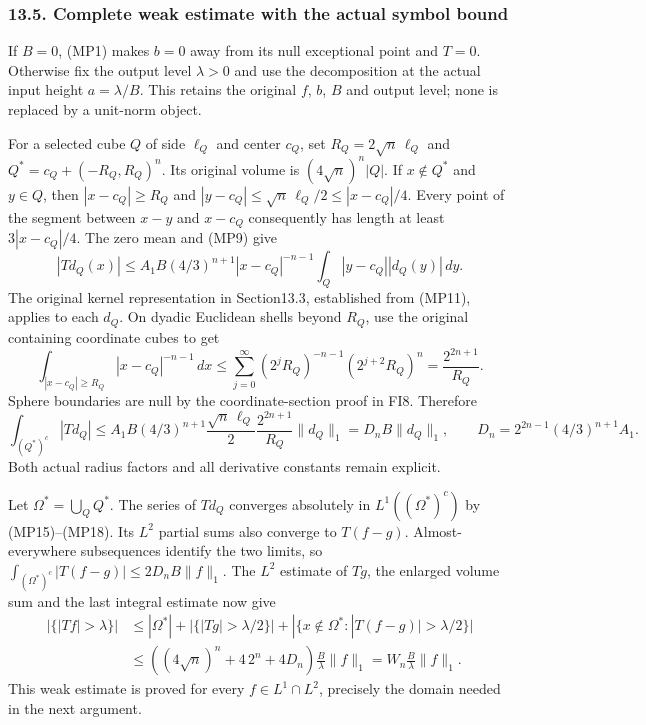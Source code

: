 \documentclass[
  11pt,
]{article}
\newcounter{none} %
\begin{document}
\subsubsection{13.5. Complete weak estimate with the actual symbol
bound}\label{complete-weak-estimate-with-the-actual-symbol-bound}

If \(B=0\), (MP1) makes \(b=0\) away from its null exceptional point and
\(T=0\). Otherwise fix the output level \(\lambda>0\) and use the
decomposition at the actual input height \(a=\lambda/B\). This retains
the original \(f\), \(b\), \(B\) and output level; none is replaced by a
unit-norm object.

For a selected cube \(Q\) of side \(\ell_Q\) and center \(c_Q\), set
\(R_Q=2\sqrt n\,\ell_Q\) and \(Q^*=c_Q+(-R_Q,R_Q)^n\). Its original
volume is \((4\sqrt n)^n|Q|\). If \(x\notin Q^*\) and \(y\in Q\), then
\(|x-c_Q|\geq R_Q\) and \(|y-c_Q|\leq\sqrt n\,\ell_Q/2\leq|x-c_Q|/4\).
Every point of the segment between \(x-y\) and \(x-c_Q\) consequently
has length at least \(3|x-c_Q|/4\). The zero mean and (MP9) give \[
 |Td_Q(x)|\leq A_1B(4/3)^{n+1}|x-c_Q|^{-n-1}
                        \int_Q|y-c_Q||d_Q(y)|\,dy .
                                                               \tag{MP16}
\] The original kernel representation in Section13.3, established from
(MP11), applies to each \(d_Q\). On dyadic Euclidean shells beyond
\(R_Q\), use the original containing coordinate cubes to get \[
 \int_{|x-c_Q|\geq R_Q}|x-c_Q|^{-n-1}\,dx
 \leq\sum_{j=0}^\infty
            (2^jR_Q)^{-n-1}(2^{j+2}R_Q)^n
 =\frac{2^{2n+1}}{R_Q}.
                                                               \tag{MP17}
\] Sphere boundaries are null by the coordinate-section proof in FI8.
Therefore \[
 \int_{(Q^*)^c}|Td_Q|
 \leq A_1B(4/3)^{n+1}
        \frac{\sqrt n\,\ell_Q}{2}\frac{2^{2n+1}}{R_Q}\|d_Q\|_1
 =D_nB\|d_Q\|_1,\qquad
 D_n=2^{2n-1}(4/3)^{n+1}A_1 .
                                                               \tag{MP18}
\] Both actual radius factors and all derivative constants remain
explicit.

Let \(\Omega^*=\bigcup_QQ^*\). The series of \(Td_Q\) converges
absolutely in \(L^1((\Omega^*)^c)\) by (MP15)--(MP18). Its \(L^2\)
partial sums also converge to \(T(f-g)\). Almost-everywhere subsequences
identify the two limits, so
\(\int_{(\Omega^*)^c}|T(f-g)|\leq2D_nB\|f\|_1\). The \(L^2\) estimate of
\(Tg\), the enlarged volume sum and the last integral estimate now give
\[
 \begin{split}
 |\{|Tf|>\lambda\}|
 &\leq|\Omega^*|+|\{|Tg|>\lambda/2\}|
       +|\{x\notin\Omega^*:|T(f-g)|>\lambda/2\}|\\
 &\leq\left((4\sqrt n)^n+4\,2^n+4D_n\right)
                   \frac{B}{\lambda}\|f\|_1
   =W_n\frac{B}{\lambda}\|f\|_1 .
 \end{split}                                                   \tag{MP19}
\] This weak estimate is proved for every \(f\in L^1\cap L^2\),
precisely the domain needed in the next argument.
\end{document}
